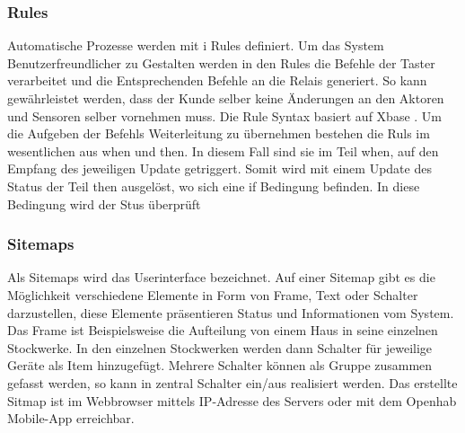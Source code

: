 \subsubsection{Rules} 
Automatische Prozesse werden mit i Rules definiert. Um das System Benutzerfreundlicher zu Gestalten werden in den Rules die Befehle der Taster verarbeitet und die Entsprechenden Befehle an die Relais generiert. So kann gewährleistet werden, dass der Kunde selber keine Änderungen an den Aktoren und Sensoren selber vornehmen muss. Die Rule Syntax basiert auf Xbase \cite{noauthor_xtext_nodate}. Um die Aufgeben der Befehls Weiterleitung zu übernehmen bestehen die Ruls im wesentlichen aus when und then. In diesem Fall sind sie im Teil when, auf den Empfang des jeweiligen Update getriggert. Somit wird mit einem Update des Status der Teil then ausgelöst, wo sich eine if Bedingung befinden. In diese Bedingung wird der Stus überprüft      

\subsubsection{Sitemaps} 
Als Sitemaps wird das Userinterface bezeichnet. Auf einer Sitemap  gibt es die Möglichkeit verschiedene Elemente in Form von Frame, Text oder Schalter darzustellen, diese Elemente präsentieren Status und Informationen vom System. Das Frame ist Beispielsweise die Aufteilung von einem Haus in seine einzelnen Stockwerke. In den einzelnen Stockwerken werden dann Schalter für jeweilige Geräte als Item hinzugefügt. Mehrere Schalter können als Gruppe zusammen gefasst werden, so kann in zentral Schalter ein/aus realisiert werden. Das erstellte Sitmap ist im Webbrowser mittels IP-Adresse des Servers oder mit dem Openhab Mobile-App erreichbar.

